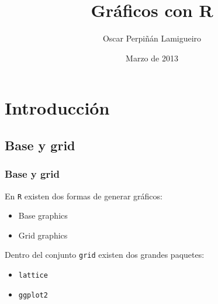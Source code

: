 \documentclass[xcolor={usenames,svgnames,dvipsnames}]{beamer}
\title{Gráficos con R}
\author{Oscar Perpiñán Lamigueiro}
\date{Marzo de 2013}
\begin{document}
\maketitle




\section{Introducción}
\label{sec-1}
\subsection{Base y grid}
\label{sec-1-1}
\begin{frame}
\frametitle{Base y grid}
\label{sec-1-1-1}

 En \texttt{R} existen dos formas de generar gráficos:
\begin{itemize}
\item Base graphics
\item Grid graphics
\end{itemize}

Dentro del conjunto \texttt{grid} existen dos grandes paquetes:
\begin{itemize}
\item \texttt{lattice}
\item \texttt{ggplot2}
\end{itemize}
\end{frame}
\end{document}
